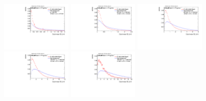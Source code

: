 \begin{figure}
\bigskip
\includegraphics[width=0.3\textwidth]{sascha_input/Appendix/Distributions/higgs/distributions/beta3/h_recoJet_D2_3_bin1.pdf} \hspace{1mm}
\includegraphics[width=0.3\textwidth]{sascha_input/Appendix/Distributions/higgs/distributions/beta3/h_recoJet_D2_3_bin2.pdf} \hspace{4mm}
\includegraphics[width=0.3\textwidth]{sascha_input/Appendix/Distributions/higgs/distributions/beta3/h_recoJet_D2_3_bin3.pdf} 
\bigskip
\includegraphics[width=0.3\textwidth]{sascha_input/Appendix/Distributions/higgs/distributions/beta3/h_recoJet_D2_3_bin4.pdf} \hspace{4mm}
\includegraphics[width=0.3\textwidth]{sascha_input/Appendix/Distributions/higgs/distributions/beta3/h_recoJet_D2_3_bin5.pdf} 


\end{figure}
